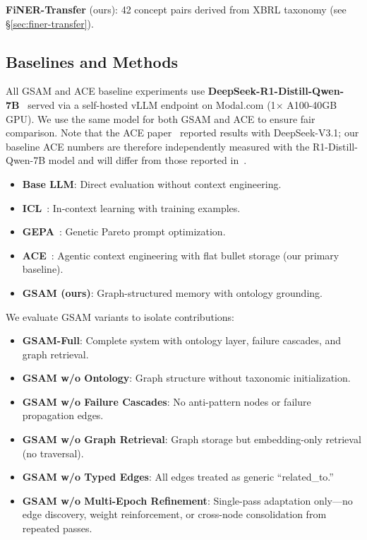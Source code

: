 \documentclass[12pt,a4paper]{article}
\begin{document}
\textbf{FiNER-Transfer} (ours): 42 concept pairs derived from XBRL taxonomy (see \S\ref{sec:finer-transfer}).

\subsection{Baselines and Methods}

All GSAM and ACE baseline experiments use \textbf{DeepSeek-R1-Distill-Qwen-7B}~\cite{deepseek2024} served via a self-hosted vLLM endpoint on Modal.com (1$\times$ A100-40GB GPU). We use the same model for both GSAM and ACE to ensure fair comparison. Note that the ACE paper~\cite{ace2025} reported results with DeepSeek-V3.1; our baseline ACE numbers are therefore independently measured with the R1-Distill-Qwen-7B model and will differ from those reported in~\cite{ace2025}.

\begin{itemize}[leftmargin=*]
\item \textbf{Base LLM}: Direct evaluation without context engineering.
\item \textbf{ICL}~\cite{brown2020language}: In-context learning with training examples.
\item \textbf{GEPA}~\cite{agrawal2025gepa}: Genetic Pareto prompt optimization.
\item \textbf{ACE}~\cite{ace2025}: Agentic context engineering with flat bullet storage (our primary baseline).
\item \textbf{GSAM (ours)}: Graph-structured memory with ontology grounding.
\end{itemize}

We evaluate GSAM variants to isolate contributions:
\begin{itemize}[leftmargin=*]
\item \textbf{GSAM-Full}: Complete system with ontology layer, failure cascades, and graph retrieval.
\item \textbf{GSAM w/o Ontology}: Graph structure without taxonomic initialization.
\item \textbf{GSAM w/o Failure Cascades}: No anti-pattern nodes or failure propagation edges.
\item \textbf{GSAM w/o Graph Retrieval}: Graph storage but embedding-only retrieval (no traversal).
\item \textbf{GSAM w/o Typed Edges}: All edges treated as generic ``related\_to.''
\item \textbf{GSAM w/o Multi-Epoch Refinement}: Single-pass adaptation only---no edge discovery, weight reinforcement, or cross-node consolidation from repeated passes.
\end{itemize}
\end{document}
